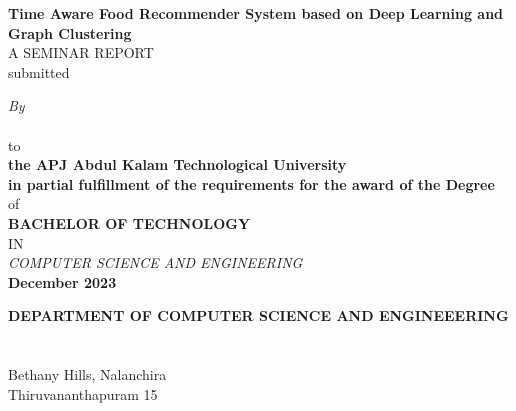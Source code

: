 \begin{titlepage}
    \begin{center}
    {\Large\sf \textbf{\textcolor[rgb]{0,0,0}{{Time Aware Food Recommender System based on Deep Learning and Graph Clustering}}}}\\[5ex]
    \vspace{0.7 cm}
    A SEMINAR REPORT\\
    submitted
    
    {\small \textcolor[rgb]{0,0,0}{\emph{By}} \\[1ex]
    {\sf {}}} \\
    \vspace{0.5 cm}
    to
    \\
    \vspace{0.5 cm}
    \textbf{the APJ Abdul Kalam Technological University \\
        in partial fulfillment of the requirements for the award of the Degree }\\
    \vspace{0.5 cm}
    of
    \\
    \textbf{BACHELOR OF TECHNOLOGY}
    \\
    IN 
    \\
    \textit{COMPUTER SCIENCE AND ENGINEERING}
    \\
    \textbf{ December 2023}
    \vspace{0.2 cm}
    
    \begin{figure}[ht]
    \begin{center}
    \end{center}
    \end{figure}
    
    {\sf \textbf{\textcolor[rgb]{0,0,0}{DEPARTMENT OF COMPUTER SCIENCE AND ENGINEEERING}}}\\[0.5ex]
    {\sf {\textcolor[rgb]{0,0,0}{MAR BASELIOS COLLEGE OF ENGINEERING \& TECHNOLOGY}}}\\[0.4ex]
    {\sf {\textcolor[rgb]{0,0,0}{(Autonomous)}}}\\[0.4ex]
    Bethany Hills, Nalanchira\\
    {\sf \textcolor[rgb]{0,0,0}{Thiruvananthapuram 15}}\\[0.5ex]
    
    \end{center}
    \end{titlepage}
    